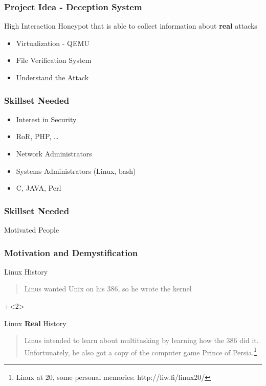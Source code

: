 \documentclass{beamer}
\begin{document}
\begin{frame}\frametitle{Project Idea - Deception System}
High Interaction Honeypot that is able to collect information about \textbf{real} attacks
  \begin{itemize}
	\item Virtualization - QEMU
	\item File Verification System
	\item Understand the Attack
  \end{itemize}
\end{frame}

\begin{frame}\frametitle{Skillset Needed}
\begin{block}{}
  \begin{itemize}
	\item Interest in Security
	\item RoR, PHP, \ldots
	\item Network Administrators
	\item Systems Administrators (Linux, bash)
	\item C, JAVA, Perl
  \end{itemize}
\end{block}
\end{frame}

\begin{frame}\frametitle{Skillset Needed}
  \begin{center}
    \Huge{Motivated People}
  \end{center}
\end{frame}

\begin{frame}\frametitle{Motivation and Demystification}
\begin{block}{Linux History}
\begin{quote}
Linus wanted Unix on his 386, so he wrote the kernel
\end{quote}
\end{block}
\onslide+<2>
\begin{block}{Linux \textbf{Real} History}
\begin{quote}
Linus intended to learn about multitasking by learning how the 386 did it.
Unfortunately, he also got a copy of the computer game Prince of Persia.\footnote{Linux at 20, some personal memories: http://liw.fi/linux20/}
\end{quote}
\end{block}
\end{frame}
\end{document}
